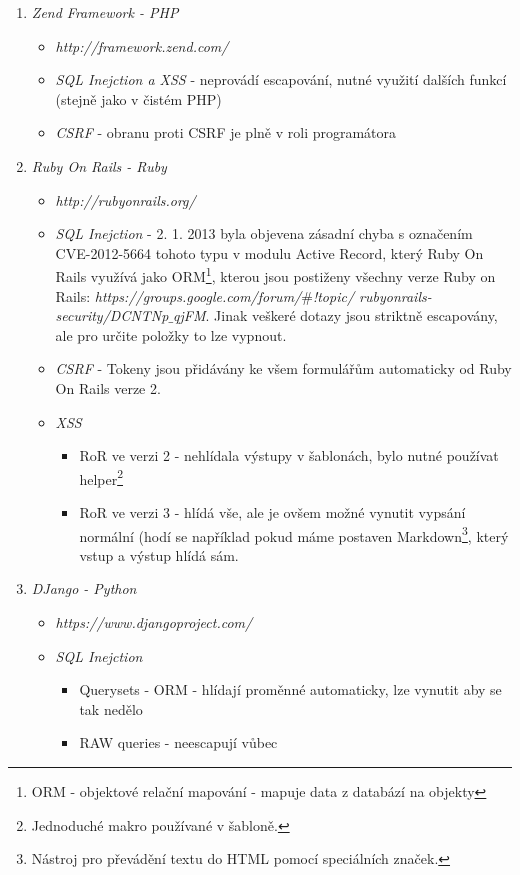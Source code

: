 \documentclass[12pt, a4paper]{report}
\begin{document}
\begin{enumerate}
\item \textit{Zend Framework - PHP} 
\begin{itemize}
\item \textit{http://framework.zend.com/}
\item \textit{SQL Inejction a XSS} - neprovádí escapování, nutné využití dalších funkcí (stejně jako v čistém PHP)
\item \textit{CSRF} - obranu proti CSRF je plně v roli programátora
\end{itemize}
\item \textit{Ruby On Rails - Ruby}
\begin{itemize}
\item \textit{http://rubyonrails.org/}
\item \textit{SQL Inejction} - 2. 1. 2013 byla objevena zásadní chyba s označením CVE-2012-5664 tohoto typu v modulu Active Record, který Ruby On Rails využívá jako ORM\footnote{ORM - objektové relační mapování - mapuje data z databází na objekty}, kterou jsou postiženy všechny verze Ruby on Rails: \textit{https://groups.google.com/forum/$\#$!topic/ rubyonrails-security/DCNTNp$\_$qjFM}. Jinak veškeré dotazy jsou striktně escapovány, ale pro určite položky to lze vypnout.
\item \textit{CSRF} - Tokeny jsou přidávány ke všem formulářům automaticky od Ruby On Rails verze 2.
\item \textit{XSS} 
\begin{itemize}
\item RoR ve verzi 2 - nehlídala výstupy v šablonách, bylo nutné používat helper\footnote{Jednoduché makro používané v šabloně.}
\item RoR ve verzi 3 - hlídá vše, ale je ovšem možné vynutit vypsání normální (hodí se například pokud máme  postaven Markdown\footnote{Nástroj pro převádění textu do HTML pomocí speciálních značek.}, který vstup a výstup hlídá sám.
\end{itemize}
\end{itemize} 
\item \textit{DJango - Python}
\begin{itemize}
\item \textit{https://www.djangoproject.com/}
\item \textit{SQL Inejction}
\begin{itemize}
\item Querysets - ORM - hlídají proměnné automaticky, lze vynutit aby se tak nedělo
\item RAW queries - neescapují vůbec

\end{itemize}
\end{itemize}
\end{enumerate}
\end{document}
